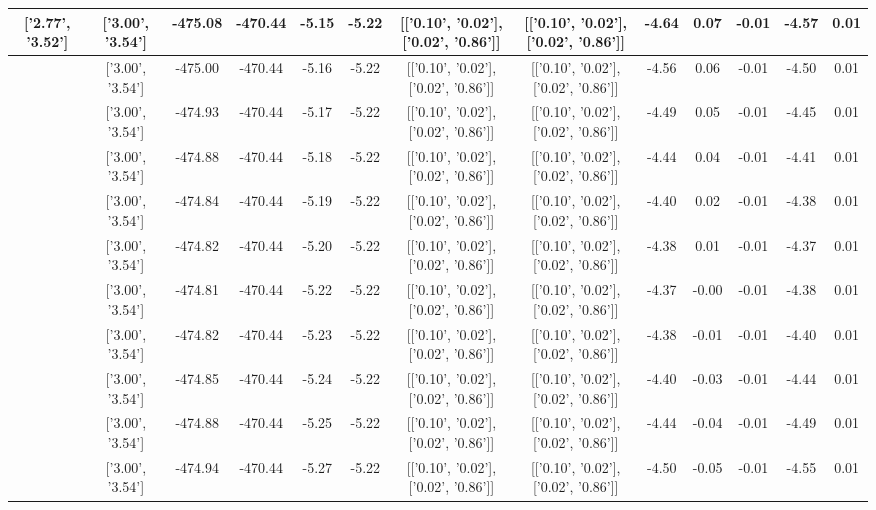 \begin{table}[htbp]
\begin{adjustbox}{angle=90}
\begin{tabular}{|c|c|c|c|c|c|c|c|c|c|c|c|c|}
 ['2.77', '3.52'] & ['3.00', '3.54'] & -475.08 & -470.44 & -5.15 & -5.22 & [['0.10', '0.02'], ['0.02', '0.86']] & [['0.10', '0.02'], ['0.02', '0.86']] & -4.64 & 0.07 & -0.01 & -4.57 & 0.01\\ \hline
 ['2.81', '3.53'] & ['3.00', '3.54'] & -475.00 & -470.44 & -5.16 & -5.22 & [['0.10', '0.02'], ['0.02', '0.86']] & [['0.10', '0.02'], ['0.02', '0.86']] & -4.56 & 0.06 & -0.01 & -4.50 & 0.01\\ \hline
 ['2.85', '3.53'] & ['3.00', '3.54'] & -474.93 & -470.44 & -5.17 & -5.22 & [['0.10', '0.02'], ['0.02', '0.86']] & [['0.10', '0.02'], ['0.02', '0.86']] & -4.49 & 0.05 & -0.01 & -4.45 & 0.01\\ \hline
 ['2.88', '3.53'] & ['3.00', '3.54'] & -474.88 & -470.44 & -5.18 & -5.22 & [['0.10', '0.02'], ['0.02', '0.86']] & [['0.10', '0.02'], ['0.02', '0.86']] & -4.44 & 0.04 & -0.01 & -4.41 & 0.01\\ \hline
 ['2.92', '3.53'] & ['3.00', '3.54'] & -474.84 & -470.44 & -5.19 & -5.22 & [['0.10', '0.02'], ['0.02', '0.86']] & [['0.10', '0.02'], ['0.02', '0.86']] & -4.40 & 0.02 & -0.01 & -4.38 & 0.01\\ \hline
 ['2.96', '3.54'] & ['3.00', '3.54'] & -474.82 & -470.44 & -5.20 & -5.22 & [['0.10', '0.02'], ['0.02', '0.86']] & [['0.10', '0.02'], ['0.02', '0.86']] & -4.38 & 0.01 & -0.01 & -4.37 & 0.01\\ \hline
 ['3.00', '3.54'] & ['3.00', '3.54'] & -474.81 & -470.44 & -5.22 & -5.22 & [['0.10', '0.02'], ['0.02', '0.86']] & [['0.10', '0.02'], ['0.02', '0.86']] & -4.37 & -0.00 & -0.01 & -4.38 & 0.01\\ \hline
 ['3.04', '3.54'] & ['3.00', '3.54'] & -474.82 & -470.44 & -5.23 & -5.22 & [['0.10', '0.02'], ['0.02', '0.86']] & [['0.10', '0.02'], ['0.02', '0.86']] & -4.38 & -0.01 & -0.01 & -4.40 & 0.01\\ \hline
 ['3.07', '3.54'] & ['3.00', '3.54'] & -474.85 & -470.44 & -5.24 & -5.22 & [['0.10', '0.02'], ['0.02', '0.86']] & [['0.10', '0.02'], ['0.02', '0.86']] & -4.40 & -0.03 & -0.01 & -4.44 & 0.01\\ \hline
 ['3.11', '3.55'] & ['3.00', '3.54'] & -474.88 & -470.44 & -5.25 & -5.22 & [['0.10', '0.02'], ['0.02', '0.86']] & [['0.10', '0.02'], ['0.02', '0.86']] & -4.44 & -0.04 & -0.01 & -4.49 & 0.01\\ \hline
 ['3.15', '3.55'] & ['3.00', '3.54'] & -474.94 & -470.44 & -5.27 & -5.22 & [['0.10', '0.02'], ['0.02', '0.86']] & [['0.10', '0.02'], ['0.02', '0.86']] & -4.50 & -0.05 & -0.01 & -4.55 & 0.01\\ \hline

\end{tabular}
\end{adjustbox}
\end{table}
